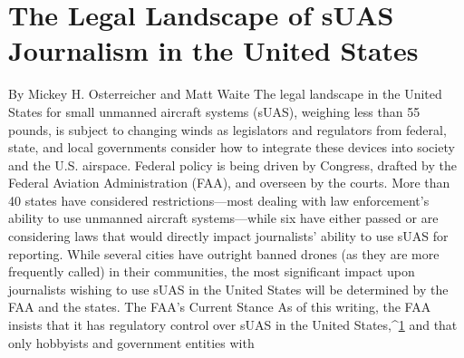 \section{The Legal Landscape of sUAS Journalism in the United States}
By Mickey H. Osterreicher and Matt Waite
The legal landscape in the United States for small unmanned aircraft systems
(sUAS), weighing less than 55 pounds, is subject to changing winds
as legislators and regulators from federal, state, and local governments
consider how to integrate these devices into society and the U.S. airspace.
Federal policy is being driven by Congress, drafted by the Federal Aviation
Administration (FAA), and overseen by the courts. More than 40 states
have considered restrictions—most dealing with law enforcement's ability
to use unmanned aircraft systems—while six have either passed or are considering
laws that would directly impact journalists' ability to use sUAS for
reporting. While several cities have outright banned drones (as they are
more frequently called) in their communities, the most significant impact
upon journalists wishing to use sUAS in the United States will be determined
by the FAA and the states.
The FAA's Current Stance
As of this writing, the FAA insists that it has regulatory control over sUAS
in the United States,^{\href{#endnotes-waite-and-osterreicher}{1}} and that only hobbyists and government entities with

